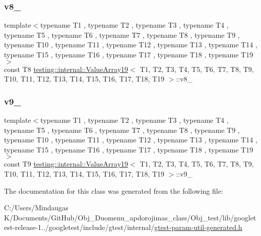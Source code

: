 \subsubsection{\texorpdfstring{v8\_}{v8\_}}
{\footnotesize\ttfamily template$<$typename T1 , typename T2 , typename T3 , typename T4 , typename T5 , typename T6 , typename T7 , typename T8 , typename T9 , typename T10 , typename T11 , typename T12 , typename T13 , typename T14 , typename T15 , typename T16 , typename T17 , typename T18 , typename T19 $>$ \\
const T8 \mbox{\hyperlink{classtesting_1_1internal_1_1_value_array19}{testing\+::internal\+::\+Value\+Array19}}$<$ T1, T2, T3, T4, T5, T6, T7, T8, T9, T10, T11, T12, T13, T14, T15, T16, T17, T18, T19 $>$\+::v8\+\_\+\hspace{0.3cm}{\ttfamily [private]}}

\mbox{\label{classtesting_1_1internal_1_1_value_array19_adefeeec6e3380d302de325d29fa04e92}} 
\subsubsection{\texorpdfstring{v9\_}{v9\_}}
{\footnotesize\ttfamily template$<$typename T1 , typename T2 , typename T3 , typename T4 , typename T5 , typename T6 , typename T7 , typename T8 , typename T9 , typename T10 , typename T11 , typename T12 , typename T13 , typename T14 , typename T15 , typename T16 , typename T17 , typename T18 , typename T19 $>$ \\
const T9 \mbox{\hyperlink{classtesting_1_1internal_1_1_value_array19}{testing\+::internal\+::\+Value\+Array19}}$<$ T1, T2, T3, T4, T5, T6, T7, T8, T9, T10, T11, T12, T13, T14, T15, T16, T17, T18, T19 $>$\+::v9\+\_\+\hspace{0.3cm}{\ttfamily [private]}}



The documentation for this class was generated from the following file\+:\begin{DoxyCompactItemize}
\item 
C\+:/\+Users/\+Mindaugas K/\+Documents/\+Git\+Hub/\+Obj\+\_\+\+Duomenu\+\_\+apdorojimas\+\_\+class/\+Obj\+\_\+test/lib/googletest-\/release-\/1../googletest/include/gtest/internal/\mbox{\hyperlink{gtest-param-util-generated_8h}{gtest-\/param-\/util-\/generated.\+h}}\end{DoxyCompactItemize}
